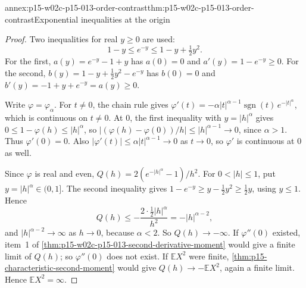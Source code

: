 \begin{annexitem}{annex:p15-w02c-p15-013-order-contrast}{thm:p15-w02c-p15-013-order-contrast}{Exponential inequalities at the origin}
\begin{proof}
Two inequalities for real \(y\geq0\) are used:
\[
 1-y\leq e^{-y}\leq1-y+\tfrac12y^2 .
\]
For the first, \(a(y)=e^{-y}-1+y\) has \(a(0)=0\) and
\(a'(y)=1-e^{-y}\geq0\). For the second, \(b(y)=1-y+\tfrac12y^2-e^{-y}\) has
\(b(0)=0\) and \(b'(y)=-1+y+e^{-y}=a(y)\geq0\).

Write \(\varphi=\varphi_\alpha\). For \(t\neq0\), the chain rule gives
\(\varphi'(t)=-\alpha|t|^{\alpha-1}\operatorname{sgn}(t)\,e^{-|t|^\alpha}\),
which is continuous on \(t\neq0\). At \(0\), the first inequality with
\(y=|h|^\alpha\) gives \(0\leq1-\varphi(h)\leq|h|^\alpha\), so
\(|(\varphi(h)-\varphi(0))/h|\leq|h|^{\alpha-1}\to0\), since \(\alpha>1\).
Thus \(\varphi'(0)=0\). Also \(|\varphi'(t)|\leq\alpha|t|^{\alpha-1}\to0\) as
\(t\to0\), so \(\varphi'\) is continuous at \(0\) as well.

Since \(\varphi\) is real and even,
\(Q(h)=2(e^{-|h|^\alpha}-1)/h^2\). For \(0<|h|\leq1\), put
\(y=|h|^\alpha\in(0,1]\). The second inequality gives
\(1-e^{-y}\geq y-\tfrac12y^2\geq\tfrac12y\), using \(y\leq1\). Hence
\[
 Q(h)\leq-\frac{2\cdot\tfrac12|h|^\alpha}{h^2}=-|h|^{\alpha-2},
\]
and \(|h|^{\alpha-2}\to\infty\) as \(h\to0\), because \(\alpha<2\). So
\(Q(h)\to-\infty\). If \(\varphi''(0)\) existed, item~1 of
\cref{thm:p15-w02c-p15-013-second-derivative-moment} would give a finite
limit of \(Q(h)\); so \(\varphi''(0)\) does not exist. If
\(\mathbb EX^2\) were finite, \cref{thm:p15-characteristic-second-moment}
would give \(Q(h)\to-\mathbb EX^2\), again a finite limit. Hence
\(\mathbb EX^2=\infty\).
\end{proof}
\end{annexitem}

